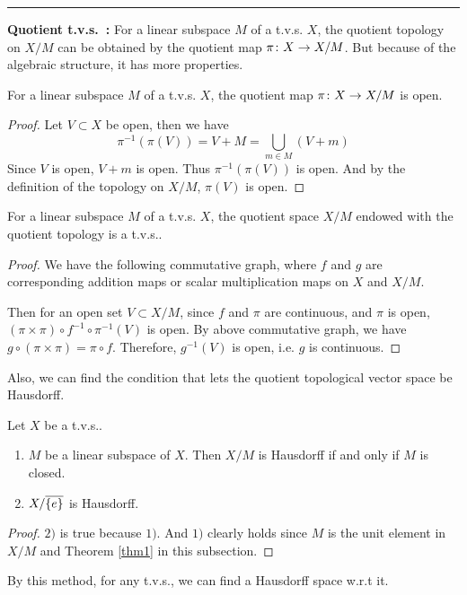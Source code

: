 \documentclass[a4paper,11pt]{report}
\begin{document}
\vspace{0.2in}
\rule{1mm}{1mm} \textbf{Quotient t.v.s.~:} For a linear subspace $M$ of a t.v.s. $X$, the quotient topology on $X/M$ can be obtained by the quotient map $\pi \colon X \rightarrow X/M$. But because of the algebraic structure, it has more properties.
\begin{prop}
	For a linear subspace $M$ of a t.v.s. $X$, the quotient map $\pi \colon X \rightarrow X/M$ is open.
\end{prop}
\begin{proof}
	Let $V \subset X$ be open, then we have
	\begin{equation*}
		\pi^{-1}(\pi(V)) = V + M = \bigcup_{m \in M}(V+m)
	\end{equation*}
	Since $V$ is open, $V+m$ is open. Thus $\pi^{-1}(\pi(V))$ is open. And by the definition of the topology on $X/M$, $\pi(V)$ is open.
\end{proof}
\begin{cor}
	For a linear subspace $M$ of a t.v.s. $X$, the quotient space $X/M$ endowed with the quotient topology is a t.v.s..
\end{cor}
\begin{proof}
	We have the following commutative graph, where $f$ and $g$ are corresponding addition maps or scalar multiplication maps on $X$ and $X/M$.
	\begin{center}
	\end{center}
	Then for an open set $V \subset X/M$, since $f$ and $\pi$ are continuous, and $\pi$ is open, $(\pi \times \pi) \circ f^{-1} \circ \pi^{-1}(V)$ is open. By above commutative graph, we have $g \circ (\pi \times \pi) = \pi \circ f$. Therefore, $g^{-1}(V)$ is open, i.e. $g$ is continuous.
\end{proof}

Also, we can find the condition that lets the quotient topological vector space be Hausdorff.
\begin{prop}
	Let $X$ be a t.v.s..
	\begin{enumerate}[label=\arabic*)]
		\item $M$ be a linear subspace of $X$. Then $X/M$ is Hausdorff if and only if $M$ is closed.
		\item $X/\overline{\{e\}}$ is Hausdorff.
	\end{enumerate}	 
\end{prop}
\begin{proof}
	$2)$ is true because $1)$. And $1)$ clearly holds since $M$ is the unit element in $X/M$ and Theorem \ref{thm1} in this subsection.
\end{proof}
\begin{rem}
	By this method, for any t.v.s., we can find a Hausdorff space w.r.t it.
\end{rem}
\end{document}
